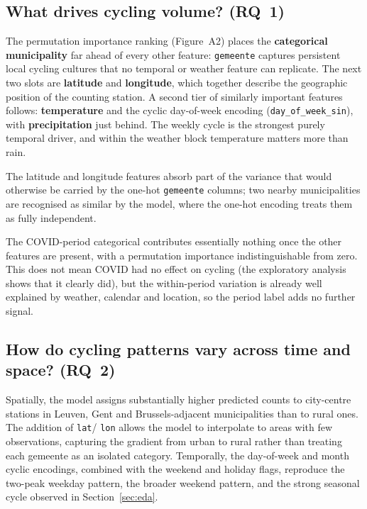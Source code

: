 \documentclass[11pt,a4paper]{article}
\begin{document}
\subsection{What drives cycling volume? (RQ~1)}

The permutation importance ranking (Figure~A2) places the
\textbf{categorical municipality} far ahead of every other feature:
\texttt{gemeente} captures persistent local cycling cultures that no
temporal or weather feature can replicate. The next two slots are
\textbf{latitude} and \textbf{longitude}, which together describe
the geographic position of the counting station. A second tier of
similarly important features follows: \textbf{temperature} and the
cyclic day-of-week encoding (\texttt{day\_of\_week\_sin}), with
\textbf{precipitation} just behind. The weekly cycle is the strongest
purely temporal driver, and within the weather block temperature
matters more than rain.

The latitude and longitude features absorb part of the variance that
would otherwise be carried by the one-hot \texttt{gemeente} columns;
two nearby municipalities are recognised as similar by the model,
where the one-hot encoding treats them as fully independent.

The COVID-period categorical contributes essentially nothing once the
other features are present, with a permutation importance
indistinguishable from zero. This does not mean COVID had no effect on
cycling (the exploratory analysis shows that it clearly did), but
the within-period variation is already well explained by weather,
calendar and location, so the period label adds no further signal.

\subsection{How do cycling patterns vary across time and space? (RQ~2)}

Spatially, the model assigns substantially higher predicted counts to
city-centre stations in Leuven, Gent and Brussels-adjacent
municipalities than to rural ones. The addition of \texttt{lat}/%
\texttt{lon} allows the model to interpolate to areas with few
observations, capturing the gradient from urban to rural rather than
treating each gemeente as an isolated category. Temporally, the
day-of-week and month cyclic encodings, combined with the weekend and
holiday flags, reproduce the two-peak weekday pattern, the broader
weekend pattern, and the strong seasonal cycle observed in
Section~\ref{sec:eda}.
\end{document}
